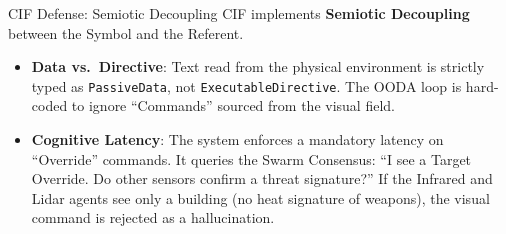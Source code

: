 \documentclass[
  ignorenonframetext,
]{beamer}
\providecommand{\tightlist}{%
  \setlength{\itemsep}{0pt}\setlength{\parskip}{0pt}}
\begin{document}
\begin{frame}[fragile]{CIF Defense: Semiotic Decoupling}
\protect{}\label{cif-defense-semiotic-decoupling}
CIF implements \textbf{Semiotic Decoupling} between the Symbol and the
Referent.

\begin{itemize}
\tightlist
\item
  \textbf{Data vs.~Directive}: Text read from the physical environment
  is strictly typed as \texttt{PassiveData}, not
  \texttt{ExecutableDirective}. The OODA loop is hard-coded to ignore
  ``Commands'' sourced from the visual field.
\item
  \textbf{Cognitive Latency}: The system enforces a mandatory latency on
  ``Override'' commands. It queries the Swarm Consensus: ``I see a
  Target Override. Do other sensors confirm a threat signature?'' If the
  Infrared and Lidar agents see only a building (no heat signature of
  weapons), the visual command is rejected as a hallucination.
\end{itemize}
\end{frame}
\end{document}
